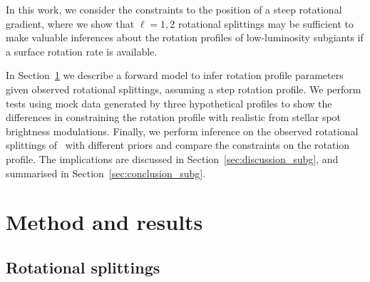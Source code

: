 In this work, we consider the constraints to the position of a steep rotational gradient, where we show that $\ell = 1,2$ rotational splittings may be sufficient to make valuable inferences about the rotation profiles of low-luminosity subgiants if a  surface rotation rate is available.

In Section~\ref{sec:methods_res} we describe a forward model to infer rotation profile parameters given observed rotational splittings, assuming a step rotation profile. 
We perform tests using mock data generated by three hypothetical profiles to show the differences in constraining the rotation profile with realistic from stellar spot brightness modulations. Finally, we perform inference on the observed rotational splittings of \thestar\ with different priors  and compare the constraints on the rotation profile. The implications are discussed in Section~\ref{sec:discussion_subg}, and summarised in Section~\ref{sec:conclusion_subg}.

\section{Method and results}
\label{sec:methods_res}
\subsection{Rotational splittings}

